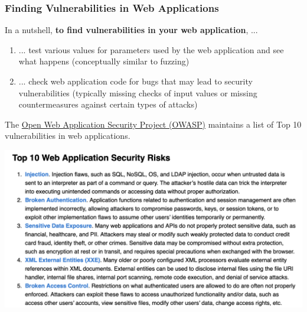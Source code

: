 
\begin{frame}
    \frametitle{Finding Vulnerabilities in Web Applications}
    In a nutshell, \textbf{to find vulnerabilities in your web application}, ...
    \begin{enumerate}
        \item ... test various values for parameters used by the web application and see what happens (conceptually similar to fuzzing)
        \item ... check web application code for bugs that may lead to security vulnerabilities (typically missing checks of input values or missing countermeasures against certain types of attacks)
    \end{enumerate}
\end{frame}

\begin{frame}

    The \href{https://owasp.org/www-project-top-ten/}{Open Web Application Security Project (OWASP)} maintains a list of Top 10 vulnerabilities in web applications.

    \begin{center}
        \includegraphics[scale=.35,angle=2]{img/owasp-top10.png}    
    \end{center}
\end{frame}


